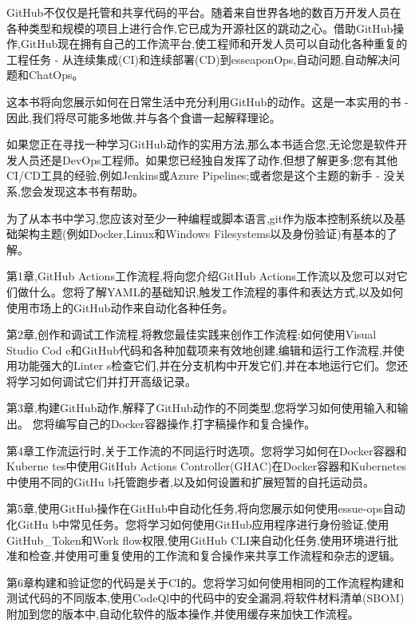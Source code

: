 GitHub不仅仅是托管和共享代码的平台。随着来自世界各地的数百万开发人员在各种类型和规模的项目上进行合作,它已成为开源社区的跳动之心。借助GitHub操作,GitHub现在拥有自己的工作流平台,使工程师和开发人员可以自动化各种重复的工程任务 - 从连续集成(CI)和连续部署(CD)到esseaponOps,自动问题,自动解决问题和ChatOps。

这本书将向您展示如何在日常生活中充分利用GitHub的动作。这是一本实用的书 - 因此,我们将尽可能多地做,并与各个食谱一起解释理论。


如果您正在寻找一种学习GitHub动作的实用方法,那么本书适合您,无论您是软件开发人员还是DevOps工程师。如果您已经独自发挥了动作,但想了解更多;您有其他CI/CD工具的经验,例如Jenkins或Azure Pipelines;或者您是这个主题的新手 - 没关系,您会发现这本书有帮助。

为了从本书中学习,您应该对至少一种编程或脚本语言,git作为版本控制系统以及基础架构主题(例如Docker,Linux和Windows Filesystems以及身份验证)有基本的了解。


第1章,GitHub Actions工作流程,将向您介绍GitHub Actions工作流以及您可以对它们做什么。您将了解YAML的基础知识,触发工作流程的事件和表达方式,以及如何使用市场上的GitHub动作来自动化各种任务。

第2章,创作和调试工作流程,将教您最佳实践来创作工作流程:如何使用Visual Studio Cod e和GitHub代码和各种加载项来有效地创建,编辑和运行工作流程,并使用功能强大的Linter s检查它们,并在分支机构中开发它们,并在本地运行它们。您还将学习如何调试它们并打开高级记录。

第3章,构建GitHub动作,解释了GitHub动作的不同类型,您将学习如何使用输入和输出。
您将编写自己的Docker容器操作,打字稿操作和复合操作。

第4章工作流运行时,关于工作流的不同运行时选项。您将学习如何在Docker容器和Kuberne tes中使用GitHub Actions Controller(GHAC)在Docker容器和Kubernetes中使用不同的GitHu b托管跑步者,以及如何设置和扩展短暂的自托运动员。

第5章,使用GitHub操作在GitHub中自动化任务,将向您展示如何使用essue-ops自动化GitHu b中常见任务。您将学习如何使用GitHub应用程序进行身份验证,使用GitHub\_Token和Work flow权限,使用GitHub CLI来自动化任务,使用环境进行批准和检查,并使用可重复使用的工作流和复合操作来共享工作流程和杂志的逻辑。

第6章构建和验证您的代码是关于CI的。您将学习如何使用相同的工作流程构建和测试代码的不同版本,使用CodeQl中的代码中的安全漏洞,将软件材料清单(SBOM)附加到您的版本中,自动化软件的版本操作,并使用缓存来加快工作流程。

